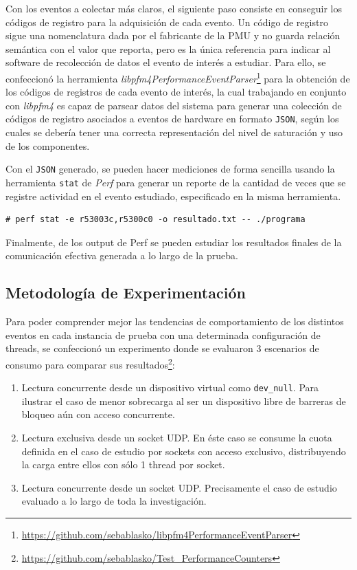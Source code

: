 Con los eventos a colectar más claros, el siguiente paso consiste en conseguir los códigos de registro para la adquisición de cada evento. Un código de registro sigue una nomenclatura dada por el fabricante de la PMU y no guarda relación semántica con el valor que reporta, pero es la única referencia para indicar al software de recolección de datos el evento de interés a estudiar. Para ello, se confeccionó la herramienta \emph{libpfm4PerformanceEventParser}\footnote{\url{https://github.com/sebablasko/libpfm4PerformanceEventParser}} para la obtención de los códigos de registros de cada evento de interés, la cual trabajando en conjunto con \emph{libpfm4} es capaz de parsear datos del sistema para generar una colección de códigos de registro asociados a eventos de hardware en formato \verb=JSON=, según los cuales se debería tener una correcta representación del nivel de saturación y uso de los componentes.

Con el \verb=JSON= generado, se pueden hacer mediciones de forma sencilla usando la herramienta \verb=stat= de \emph{Perf} para generar un reporte de la cantidad de veces que se registre actividad en el evento estudiado, especificado en la misma herramienta.

\vspace{1pc}
\begin{lstlisting}[style=BashInputStyle, breaklines=true, captionpos=b, caption={Ejemplo de uso de Perf para colectar datos de una colección de eventos sobre un script llamado programa. En éste caso se configura para colectar datos de 2 eventos y dejar el reporte de salida en un archivo resultado.txt}]
	# perf stat -e r53003c,r5300c0 -o resultado.txt -- ./programa
\end{lstlisting}

Finalmente, de los output de Perf se pueden estudiar los resultados finales de la comunicación efectiva generada a lo largo de la prueba.

\subsection{Metodología de Experimentación}
Para poder comprender mejor las tendencias de comportamiento de los distintos eventos en cada instancia de prueba con una determinada configuración de threads, se confeccionó un experimento donde se evaluaron 3 escenarios de consumo para comparar sus resultados\footnote{\url{https://github.com/sebablasko/Test_PerformanceCounters}}:

\begin{enumerate}
\item Lectura concurrente desde un dispositivo virtual como \verb=dev_null=. Para ilustrar el caso de menor sobrecarga al ser un dispositivo libre de barreras de bloqueo aún con acceso concurrente.
\item Lectura exclusiva desde un socket UDP. En éste caso se consume la cuota definida en el caso de estudio por sockets con acceso exclusivo, distribuyendo la carga entre ellos con sólo 1 thread por socket. 
\item Lectura concurrente desde un socket UDP. Precisamente el caso de estudio evaluado a lo largo de toda la investigación.
\end{enumerate}

